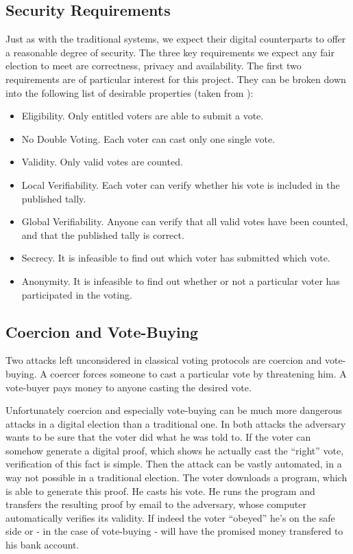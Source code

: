 \documentclass{article}
\begin{document}
\subsection{Security Requirements}
Just as with the traditional systems, we expect their digital counterparts to offer a reasonable degree of security. The three key requirements we expect any fair election to meet are correctness, privacy and availability.
The first two requirements are of particular interest for this project. They can be broken down into the following list of desirable properties (taken from \cite{Hirt01}):

\begin{itemize}
\item {\sc Eligibility.} Only entitled voters are able to submit a vote.
\item {\sc No Double Voting.} Each voter can cast only one single vote.
\item {\sc Validity.} Only valid votes are counted.
\item {\sc Local Verifiability.} Each voter can verify whether his vote is included in the published tally.
\item {\sc Global Verifiability.} Anyone can verify that all valid votes have been counted, and that the published tally is correct.
\end{itemize}

\begin{itemize}
  \item {\sc Secrecy.} It is infeasible to find out which voter has submitted which vote.
  \item {\sc Anonymity.} It is infeasible to find out whether or not a particular voter has participated in the voting.
\end{itemize}


\subsection{Coercion and Vote-Buying}
Two attacks left unconsidered in classical voting protocols are coercion and vote-buying. A coercer forces someone to cast a particular vote by threatening him. A vote-buyer pays money to anyone casting the desired vote.

Unfortunately coercion and especially vote-buying can be much more dangerous attacks in a digital election than a traditional one. In both attacks the adversary wants to be sure that the voter did what he was told to. If the voter can somehow generate a digital proof, which shows he actually cast the ``right'' vote, verification of this fact is simple. Then the attack can be vastly automated, in a way not possible in a traditional election.
The voter downloads a program, which is able to generate this proof. He casts his vote. He runs the program and transfers the resulting proof by email to the adversary, whose computer automatically verifies its validity. If indeed the voter ``obeyed'' he's on the safe side or - in the case of vote-buying - will have the promised money transfered to his bank account.
\end{document}

